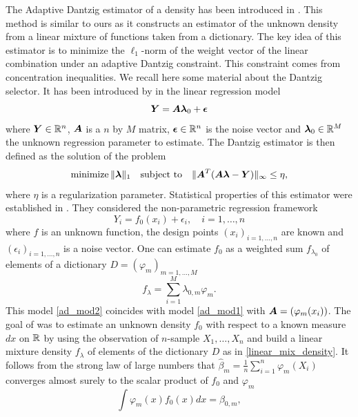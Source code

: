 The Adaptive Dantzig estimator of a density has been introduced in \citep{Bertin}. This method is similar to ours as it constructs an estimator of the unknown density from a linear mixture of functions taken from a dictionary. The key idea of this estimator is to minimize the $\ell_1$-norm of the weight vector of the linear combination under an adaptive Dantzig constraint. This constraint comes from concentration inequalities. We recall here some material about the Dantzig selector. It has been introduced by \citep{candes2007} in the linear regression model
\begin{equation}
\label{ad_mod1}
	\boldsymbol Y = \boldsymbol A \boldsymbol \lambda_0 + \boldsymbol \epsilon
\end{equation}
where $\boldsymbol Y\in {\mathbb R}^n$, $\boldsymbol A$ is a $n$ by $M$ matrix, $\boldsymbol \epsilon \in {\mathbb R}^n$ is the noise vector and $\boldsymbol \lambda_0 \in {\mathbb R}^M$ the unknown regression parameter to estimate. The Dantzig estimator is then defined as the solution of the problem
\begin{equation}
	 \textnormal{minimize}\,  \|\boldsymbol \lambda \|_1 \quad \text{subject to} \quad \| \boldsymbol A^T(\boldsymbol A\boldsymbol \lambda-\boldsymbol Y)\|_{\infty} \leq \eta,
\end{equation}
where $\eta$ is a regularization parameter. Statistical properties of this estimator were established in \citep{bickel2009}. They considered the non-parametric regression framework
\begin{equation}
\label{ad_mod2}
		Y_i = f_0(x_i) + \epsilon_i, \quad i=1,\dots,n
\end{equation}
where $f$ is an unknown function, the design points $(x_i)_{i=1,\dots,n}$ are known and $(\epsilon_i)_{i=1,\dots,n}$ is a noise vector. One can estimate $f_0$ as a weighted sum $f_{\lambda_0}$ of elements of a dictionary $D=(\varphi_m)_{m=1,\dots,M}$
\begin{equation}
\label{linear_mix_density}
	f_{\lambda} = \sum_{i=1}^M\lambda_{0, m}\varphi_m.
\end{equation}
This model \cref{ad_mod2} coincides with model \cref{ad_mod1} with $\boldsymbol A = (\varphi_m(x_i))$. The goal of \citep{Bertin} was to estimate an unknown density $f_0$ with respect to a known measure $dx$ on ${\mathbb R}$ by using the observation of $n$-sample $X_1,\dots,X_n$ and build a linear mixture density $f_{\lambda}$ of elements of the dictionary $D$ as in \cref{linear_mix_density}. It follows from the strong law of large numbers that $\hat\beta_m = \frac{1}{n}\sum_{i=1}^n\varphi_m(X_i)$ converges almost surely to the scalar product of $f_0$ and $\varphi_m$
\begin{equation}
      \int \varphi_m(x)f_0(x)dx=\beta_{0,m},
\end{equation}
